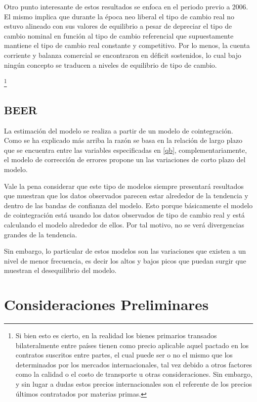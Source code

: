 \documentclass[12pt,letterpaper]{article}
\begin{document}
Otro punto interesante de estos resultados se enfoca en el periodo previo a 2006. El mismo implica que durante la época neo liberal el tipo de cambio real no estuvo alineado con sus valores de equilibrio a pesar de depreciar el tipo de cambio nominal en función al tipo de cambio referencial que supuestamente  mantiene el tipo de cambio real constante y competitivo. Por lo menos, la cuenta corriente y balanza comercial se encontraron en déficit sostenidos, lo cual bajo ningún concepto se traducen a niveles de equilibrio de tipo de cambio.

\footnote{Si bien esto es cierto, en la realidad los bienes primarios transados bilateralmente entre países tienen como precio aplicable aquel pactado en los contratos suscritos entre partes, el cual puede ser o no el mismo que los determinados por los mercados internacionales, tal vez debido a otros factores como la calidad o el costo de transporte u otras consideraciones. Sin embargo, y sin lugar a dudas estos precios internacionales son el referente de los precios últimos contratados por materias primas.}	






\subsection{BEER}
La estimación del modelo se realiza a partir de un modelo de cointegración. Como se ha explicado más arriba la razón se basa en la relación de largo plazo que se encuentra entre las variables especificadas en \ref{qb}, complementariamente, el modelo de corrección de errores propone un las variaciones de corto plazo del modelo.

Vale la pena considerar que este tipo de modelos siempre presentará resultados que muestran que los datos observados parecen estar alrededor de la tendencia y dentro de las bandas de confianza del modelo. Esto porque básicamente el modelo de cointegración está usando los datos observados de tipo de cambio real y está calculando el modelo alrededor de ellos. Por tal motivo, no se verá divergencias grandes de la tendencia.

Sin embargo, lo particular de estos modelos son las variaciones que existen a un nivel de menor frecuencia, es decir los altos y bajos picos que puedan surgir que muestran el desequilibrio del modelo.




\section{Consideraciones Preliminares}\label{consid}
\end{document}
